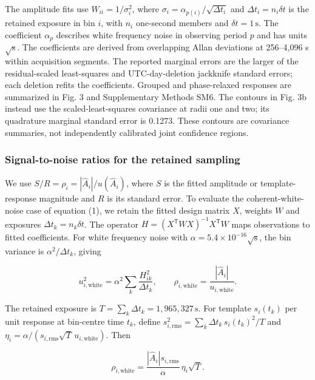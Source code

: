 \documentclass[
  11pt,
  a4paper,
]{article}
\begin{document}
The amplitude fits use \(W_{ii}=1/\sigma_i^2\), where
\(\sigma_i=\alpha_{p(i)}/\sqrt{\Delta t_i}\) and
\(\Delta t_i=n_i\delta t\) is the retained exposure in bin \(i\), with
\(n_i\) one-second members and \(\delta t=1\,\mathrm{s}\). The
coefficient \(\alpha_p\) describes white frequency noise in observing
period \(p\) and has units \(\sqrt{\mathrm{s}}\). The coefficients are
derived from overlapping Allan deviations at 256--4,096 s within
acquisition segments. The reported marginal errors are the larger of the
residual-scaled least-squares and UTC-day-deletion jackknife standard
errors; each deletion refits the coefficients. Grouped and phase-relaxed
responses are summarized in Fig. 3 and Supplementary Methods SM6. The
contours in Fig. 3b instead use the scaled-least-squares covariance at
radii one and two; its quadrature marginal standard error is 0.1273.
These contours are covariance summaries, not independently calibrated
joint confidence regions.

\hypertarget{signal-to-noise-ratios-for-the-retained-sampling}{%
\subsubsection{Signal-to-noise ratios for the retained
sampling}\label{signal-to-noise-ratios-for-the-retained-sampling}}

We use \(S/R=\rho_i=|\hat A_i|/u(\hat A_i)\), where \(S\) is the fitted
amplitude or template-response magnitude and \(R\) is its standard
error. To evaluate the coherent-white-noise case of equation (1), we
retain the fitted design matrix \(X\), weights \(W\) and exposures
\(\Delta t_k=n_k\delta t\). The operator
\(H=(X^{\mathsf T}WX)^{-1}X^{\mathsf T}W\) maps observations to fitted
coefficients. For white frequency noise with
\(\alpha=5.4\times10^{-16}\sqrt{\mathrm{s}}\), the bin variance is
\(\alpha^2/\Delta t_k\), giving

\[
u_{i,\mathrm{white}}^2=\alpha^2\sum_k\frac{H_{ik}^2}{\Delta t_k},
\qquad
\rho_{i,\mathrm{white}}=\frac{|\hat A_i|}{u_{i,\mathrm{white}}}.\tag{2}
\]

The retained exposure is \(T=\sum_k\Delta t_k=1,965,327\,\mathrm{s}\).
For template \(s_i(t_k)\) per unit response at bin-centre time \(t_k\),
define \(s_{i,\mathrm{rms}}^2=\sum_k\Delta t_k\,s_i(t_k)^2/T\) and
\(\eta_i=\alpha/(s_{i,\mathrm{rms}}\sqrt{T}\,u_{i,\mathrm{white}})\).
Then

\[
\rho_{i,\mathrm{white}}=
\frac{|\hat A_i|s_{i,\mathrm{rms}}}{\alpha}\,\eta_i\sqrt{T}.\tag{3}
\]
\end{document}
